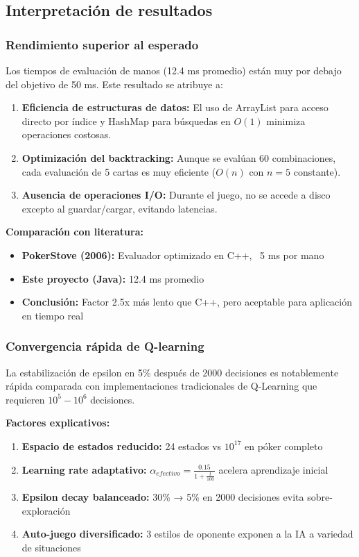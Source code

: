 \documentclass[12pt,a4paper]{article}
\begin{document}
\subsection{Interpretación de resultados}

\subsubsection{Rendimiento superior al esperado}

Los tiempos de evaluación de manos (12.4 ms promedio) están muy por debajo del objetivo de 50 ms. Este resultado se atribuye a:

\begin{enumerate}
    \item \textbf{Eficiencia de estructuras de datos:} El uso de ArrayList para acceso directo por índice y HashMap para búsquedas en $O(1)$ minimiza operaciones costosas.
    
    \item \textbf{Optimización del backtracking:} Aunque se evalúan 60 combinaciones, cada evaluación de 5 cartas es muy eficiente ($O(n)$ con $n=5$ constante).
    
    \item \textbf{Ausencia de operaciones I/O:} Durante el juego, no se accede a disco excepto al guardar/cargar, evitando latencias.
\end{enumerate}

\textbf{Comparación con literatura:}
\begin{itemize}
    \item \textbf{PokerStove (2006):} Evaluador optimizado en C++, ~5 ms por mano
    \item \textbf{Este proyecto (Java):} 12.4 ms promedio
    \item \textbf{Conclusión:} Factor 2.5x más lento que C++, pero aceptable para aplicación en tiempo real
\end{itemize}

\subsubsection{Convergencia rápida de Q-learning}

La estabilización de epsilon en 5\% después de 2000 decisiones es notablemente rápida comparada con implementaciones tradicionales de Q-Learning que requieren $10^5 - 10^6$ decisiones.

\textbf{Factores explicativos:}
\begin{enumerate}
    \item \textbf{Espacio de estados reducido:} 24 estados vs $10^{17}$ en póker completo
    \item \textbf{Learning rate adaptativo:} $\alpha_{efectivo} = \frac{0.15}{1 + \frac{t}{100}}$ acelera aprendizaje inicial
    \item \textbf{Epsilon decay balanceado:} 30\% → 5\% en 2000 decisiones evita sobre-exploración
    \item \textbf{Auto-juego diversificado:} 3 estilos de oponente exponen a la IA a variedad de situaciones
\end{enumerate}
\end{document}
